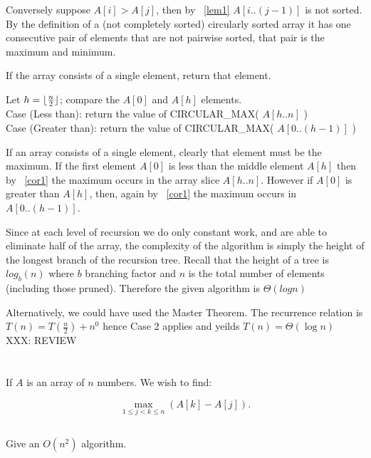 \documentclass{amsart}
\theoremstyle{definition}
\theoremstyle{remark}
\numberwithin{equation}{section}
\DeclarePairedDelimiter{\floor}{\lfloor}{\rfloor}
\begin{document}
Conversely suppose $A[i] > A[j]$, then by ~\ref{lem1} $A[i..(j-1)]$ is
not sorted. By the definition of a (not completely sorted) circularly
sorted array it has one consecutive pair of elements that are not
pairwise sorted, that pair is the maximum and minimum.


If the array consists of a single element, return that element.

Let $h = \floor{ \frac{n}{2} }$; compare the $A[0]$ and $A[h]$ elements. \\

Case (Less than): return the value of CIRCULAR\_MAX( $A[h..n]$ ) \\

Case (Greater than): return the value of CIRCULAR\_MAX( $A[0..(h-1)]$ ) \\

\proof

If an array consists of a single element, clearly that element must
be the maximum. If the first element $A[0]$ is less than the middle
element $A[h]$ then by ~\ref{cor1} the maximum occurs in the array slice
$A[h..n]$. However if $A[0]$ is greater than $A[h]$, then, again by
~\ref{cor1} the maximum occurs in $A[0..(h-1)]$.


\proof

Since at each level of recursion we do only constant work, and are able
to eliminate half of the array, the complexity of the algorithm is
simply the height of the longest branch of the recursion tree. Recall
that the height of a tree is $log_{b} (n)$ where $b$ branching factor
and $n$ is the total number of elements (including those pruned).
Therefore the given algorithm is $\Theta( log n )$

Alternatively, we could have used the Master Theorem. The recurrence
relation is $T(n) = T(\frac{n}{2}) + n^0$ hence Case 2 applies and
yeilds $T(n) = \Theta (\log n)$
\\


XXX: REVIEW
\section{} If $A$ is an array of $n$ numbers. We wish to find:

$$ \max_{1 \leq j<k \leq n} (A[k] - A[j]).$$

\subsection{} Give an $O( n^2 )$ algorithm.
\end{document}
